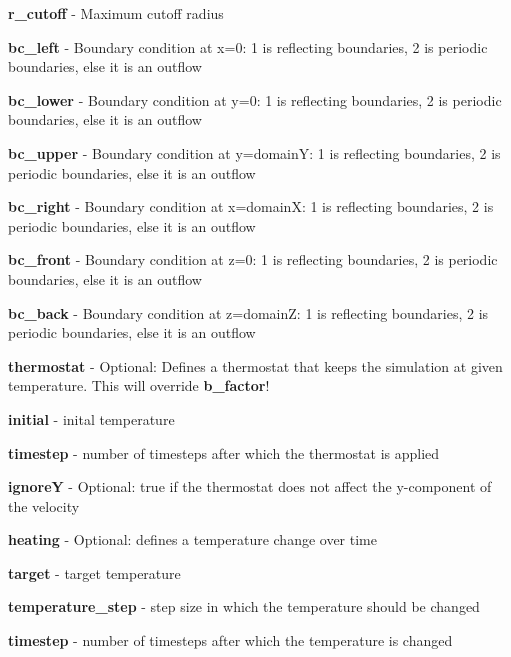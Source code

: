 \begin{DoxyItemize}
\item {\bfseries r\+\_\+cutoff} -\/ Maximum cutoff radius
\item {\bfseries bc\+\_\+left} -\/ Boundary condition at x=0\+: 1 is reflecting boundaries, 2 is periodic boundaries, else it is an outflow
\item {\bfseries bc\+\_\+lower} -\/ Boundary condition at y=0\+: 1 is reflecting boundaries, 2 is periodic boundaries, else it is an outflow
\item {\bfseries bc\+\_\+upper} -\/ Boundary condition at y=domainY\+: 1 is reflecting boundaries, 2 is periodic boundaries, else it is an outflow
\item {\bfseries bc\+\_\+right} -\/ Boundary condition at x=domainX\+: 1 is reflecting boundaries, 2 is periodic boundaries, else it is an outflow
\item {\bfseries bc\+\_\+front} -\/ Boundary condition at z=0\+: 1 is reflecting boundaries, 2 is periodic boundaries, else it is an outflow
\item {\bfseries bc\+\_\+back} -\/ Boundary condition at z=domainZ\+: 1 is reflecting boundaries, 2 is periodic boundaries, else it is an outflow
\item {\bfseries thermostat} -\/ Optional\+: Defines a thermostat that keeps the simulation at given temperature. This will override {\bfseries b\+\_\+factor}!
\begin{DoxyItemize}
\item {\bfseries initial} -\/ inital temperature
\item {\bfseries timestep} -\/ number of timesteps after which the thermostat is applied
\item {\bfseries ignoreY} -\/ Optional\+: true if the thermostat does not affect the y-\/component of the velocity
\item {\bfseries heating} -\/ Optional\+: defines a temperature change over time
\begin{DoxyItemize}
\item {\bfseries target} -\/ target temperature
\item {\bfseries temperature\+\_\+step} -\/ step size in which the temperature should be changed
\item {\bfseries timestep} -\/ number of timesteps after which the temperature is changed
\end{DoxyItemize}
\end{DoxyItemize}
\end{DoxyItemize}

